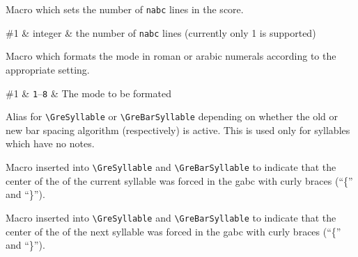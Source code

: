 Macro which sets the number of \texttt{nabc} lines in the score.

\begin{argtable}
	\#1 & integer & the number of \texttt{nabc} lines (currently only 1 is supported)\\
\end{argtable}


Macro which formats the mode in roman or arabic numerals according to the appropriate setting.

\begin{argtable}
	\#1 & \texttt{1}--\texttt{8} & The mode to be formated\\
\end{argtable}

Alias for \verb=\GreSyllable= or \verb=\GreBarSyllable= depending on whether the old or new bar spacing algorithm (respectively) is active.  This is used only for syllables which have no notes.

Macro inserted into \verb=\GreSyllable= and \verb=\GreBarSyllable= to indicate that the center of the of the current syllable was forced in the gabc with curly braces (``\{'' and ``\}'').

Macro inserted into \verb=\GreSyllable= and \verb=\GreBarSyllable= to indicate that the center of the of the next syllable was forced in the gabc with curly braces (``\{'' and ``\}'').


